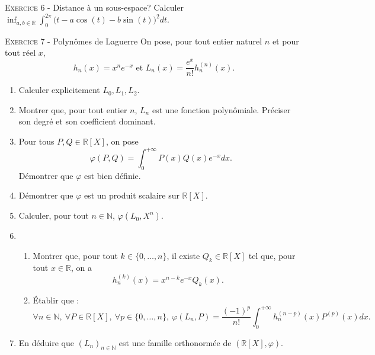 \documentclass[11pt]{article}
\begin{document}


\vskip0.3cm\noindent\textsc{Exercice 6} - Distance à un sous-espace?
\vskip0.2cm
Calculer $\displaystyle \inf_{a,b\in\mathbb R}\int_0^{2\pi} \big(t-a\cos(t)-b\sin(t)\big)^2 dt.$




\vskip0.3cm\noindent\textsc{Exercice 7} - Polynômes de Laguerre
\vskip0.2cm
On pose, pour tout entier naturel $n$ et pour tout réel $x$, 
$$h_n(x)=x^ne^{-x}\textrm{ et }L_n(x)=\frac{e^x}{n!}h_n^{(n)}(x).$$
\begin{enumerate}
\item Calculer explicitement $L_0,L_1,L_2$.
\item Montrer que, pour tout entier $n$, $L_n$ est une fonction polynômiale. Préciser son degré et son coefficient dominant.
\item Pour tous $P,Q\in\mathbb R[X]$, on pose 
$$\varphi(P,Q)=\int_0^{+\infty}P(x)Q(x)e^{-x}dx.$$
Démontrer que $\varphi$ est bien définie.
\item Démontrer que $\varphi$ est un produit scalaire sur $\mathbb R[X]$.
\item Calculer, pour tout $n\in\mathbb N$, $\varphi(L_0,X^n)$.
\item \begin{enumerate}
\item Montrer que, pour tout $k\in\{0,\dots,n\}$, il existe $Q_k\in\mathbb R[X]$ tel que, pour tout $x\in\mathbb R$, on a
$$h_n^{(k)}(x)=x^{n-k}e^{-x}Q_k(x).$$
\item \'Etablir que :
$$\forall n\in\mathbb N,\ \forall P\in\mathbb R[X],\ \forall p\in\{0,\dots,n\},\ \varphi(L_n,P)=\frac{(-1)^p}{n!}\int_0^{+\infty}h_n^{(n-p)}(x)P^{(p)}(x)dx.$$
\end{enumerate}
\item En déduire que $(L_n)_{n\in\mathbb N}$ est une famille orthonormée de $(\mathbb R[X],\varphi)$.
\end{enumerate}




\vskip0.5cm

\end{document}
